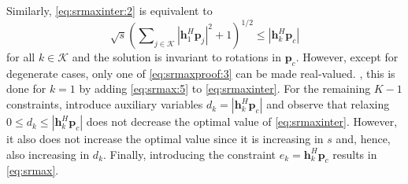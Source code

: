 \documentclass[a4paper,10pt,journal]{IEEEtran}
\let\vec\bm
\begin{document}
Similarly, \cref{eq:srmaxinter:2} is equivalent to
\begin{equation} \label{eq:srmaxproof:3}
	\sqrt s \left( \sum\nolimits_{j\in\mathcal{K}}|\vec{h}_{1}^{H}\vec{p}_{j}|^2+1 \right)^{1/2} \le |{\vec{h}}_{k}^{H}\vec{p}_{c}|
\end{equation}
for all $k\in\mathcal K$ and the solution is invariant to rotations in $\vec p_c$. However, except for degenerate cases, only one  of \cref{eq:srmaxproof:3} can be made real-valued. , this is done for $k = 1$ by adding \cref{eq:srmax:5} to \cref{eq:srmaxinter}. For the remaining $K-1$ constraints, introduce auxiliary variables $d_k = |\vec h_k^H \vec p_c|$ and observe that relaxing $0 \le d_k \le |\vec h_k^H \vec p_c|$ does not decrease the optimal value of \cref{eq:srmaxinter}. However, it also does not increase the optimal value since it is increasing in $s$ and, hence, also increasing in $d_k$. Finally, introducing the constraint $e_k = \vec h_k^H \vec p_c$ results in \cref{eq:srmax}.

\balance

\end{document}
